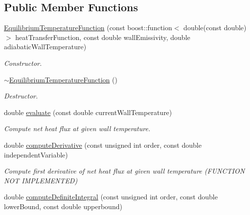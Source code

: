 \subsection*{Public Member Functions}
\begin{DoxyCompactItemize}
\item 
\hyperlink{classtudat_1_1aerodynamics_1_1EquilibriumTemperatureFunction_ac92385ff36562a2595b10800e2d7dcaa}{Equilibrium\+Temperature\+Function} (const boost\+::function$<$ double(const double) $>$ heat\+Transfer\+Function, const double wall\+Emissivity, double adiabatic\+Wall\+Temperature)
\begin{DoxyCompactList}\small\item\em Constructor. \end{DoxyCompactList}\item 
\hyperlink{classtudat_1_1aerodynamics_1_1EquilibriumTemperatureFunction_a94178bbbf87129eb32dfc2aa82aafa80}{$\sim$\+Equilibrium\+Temperature\+Function} ()\hypertarget{classtudat_1_1aerodynamics_1_1EquilibriumTemperatureFunction_a94178bbbf87129eb32dfc2aa82aafa80}{}\label{classtudat_1_1aerodynamics_1_1EquilibriumTemperatureFunction_a94178bbbf87129eb32dfc2aa82aafa80}

\begin{DoxyCompactList}\small\item\em Destructor. \end{DoxyCompactList}\item 
double \hyperlink{classtudat_1_1aerodynamics_1_1EquilibriumTemperatureFunction_abd89b7690138e463bcc52ebd667f7bfa}{evaluate} (const double current\+Wall\+Temperature)
\begin{DoxyCompactList}\small\item\em Compute net heat flux at given wall temperature. \end{DoxyCompactList}\item 
double \hyperlink{classtudat_1_1aerodynamics_1_1EquilibriumTemperatureFunction_abffe5b7f1fb949b9e1009d0434092ba8}{compute\+Derivative} (const unsigned int order, const double independent\+Variable)\hypertarget{classtudat_1_1aerodynamics_1_1EquilibriumTemperatureFunction_abffe5b7f1fb949b9e1009d0434092ba8}{}\label{classtudat_1_1aerodynamics_1_1EquilibriumTemperatureFunction_abffe5b7f1fb949b9e1009d0434092ba8}

\begin{DoxyCompactList}\small\item\em Compute first derivative of net heat flux at given wall temperature (F\+U\+N\+C\+T\+I\+ON N\+OT I\+M\+P\+L\+E\+M\+E\+N\+T\+ED) \end{DoxyCompactList}\item 
double \hyperlink{classtudat_1_1aerodynamics_1_1EquilibriumTemperatureFunction_af80114f81558e28479d8f945a209ac77}{compute\+Definite\+Integral} (const unsigned int order, const double lower\+Bound, const double upperbound)\hypertarget{classtudat_1_1aerodynamics_1_1EquilibriumTemperatureFunction_af80114f81558e28479d8f945a209ac77}{}\label{classtudat_1_1aerodynamics_1_1EquilibriumTemperatureFunction_af80114f81558e28479d8f945a209ac77}


\end{DoxyCompactItemize}
